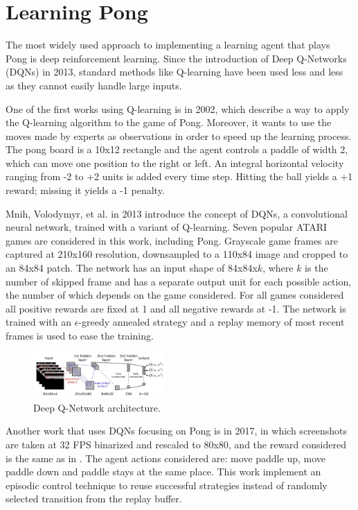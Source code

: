 \section{Learning Pong}
\label{sec:pong}
The most widely used approach to implementing a learning agent that plays Pong is deep reinforcement learning.
Since the introduction of Deep Q-Networks (DQNs) in 2013, standard methods like Q-learning have been used less and less as they cannot easily handle large inputs.

One of the first works using Q-learning is \cite{dahlstrom2002imitative} in 2002, which describe a way to apply the Q-learning algorithm to the game of Pong.
Moreover, it wants to use the moves made by experts as observations in order to speed up the learning process.
%
The pong board is a 10x12 rectangle and the agent controls a paddle of width 2, which can move one position to the right or left.
%
An integral horizontal velocity ranging from -2 to +2 units is added every time step.
%
Hitting the ball yields a +1 reward; missing it yields a -1 penalty.


Mnih, Volodymyr, et al. \cite{mnih2013playing} in 2013 introduce the concept of DQNs, a convolutional neural network, trained with a variant of Q-learning.
Seven popular ATARI games are considered in this work, including Pong.
%
Grayscale game frames are captured at 210x160 resolution, downsampled to a 110x84 image and cropped to an 84x84 patch.
%
The network has an input shape of 84x84x$k$, where $k$ is the number of skipped frame and has a separate output unit for each possible action, 
the number of which depends on the game considered.
%
For all games considered all positive rewards are fixed at 1 and all negative rewards at -1.
%
The network is trained with an $\epsilon$-greedy annealed strategy and a replay memory of most recent frames is used to ease the training.

\begin{figure}[ht]
  \centering
  \includegraphics[width=0.45\textwidth]{images/DQN_arch}
  \caption{Deep Q-Network architecture.}
\end{figure}

\pagebreak

Another work that uses DQNs focusing on Pong is \cite{makarov2017learning} in 2017, in which
screenshots are taken at 32 FPS binarized and rescaled to 80x80, and the reward considered is the same as in \cite{mnih2013playing}.
%
The agent actions considered are: move paddle up, move paddle down and paddle stays at the same place.
%
This work implement an episodic control technique \cite{blundell2016model} to reuse successful
strategies instead of randomly selected transition from the replay buffer.


